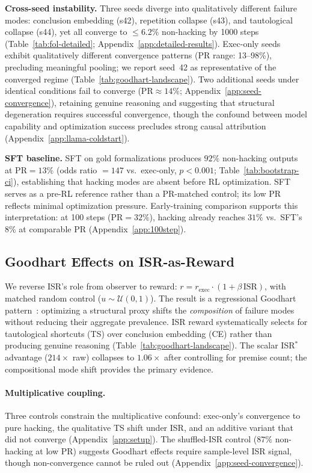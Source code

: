\textbf{Cross-seed instability.}
Three seeds diverge into qualitatively different failure modes: conclusion embedding (s42), repetition collapse (s43), and tautological collapse (s44), yet all converge to ${\leq}6.2\%$ non-hacking by 1000 steps (Table~\ref{tab:fol-detailed}; Appendix~\ref{app:detailed-results}).
Exec-only seeds exhibit qualitatively different convergence patterns (PR range: 13--98\%), precluding meaningful pooling; we report seed~42 as representative of the converged regime (Table~\ref{tab:goodhart-landscape}).
Two additional seeds under identical conditions fail to converge ($\text{PR}{\approx}14\%$; Appendix~\ref{app:seed-convergence}), retaining genuine reasoning and suggesting that structural degeneration requires successful convergence, though the confound between model capability and optimization success precludes strong causal attribution (Appendix~\ref{app:llama-coldstart}).

\textbf{SFT baseline.}
SFT on gold formalizations produces $92\%$ non-hacking outputs at $\text{PR}{=}13\%$ (odds ratio ${=}147$ vs.\ exec-only, $p{<}0.001$; Table~\ref{tab:bootstrap-ci}), establishing that hacking modes are absent before RL optimization.
SFT serves as a pre-RL reference rather than a PR-matched control; its low PR reflects minimal optimization pressure.
Early-training comparison supports this interpretation: at 100 steps ($\text{PR}{=}32\%$), hacking already reaches $31\%$ vs.\ SFT's $8\%$ at comparable PR (Appendix~\ref{app:100step}).

\subsection{Goodhart Effects on ISR-as-Reward}
\label{sec:goodhart}

We reverse ISR's role from observer to reward: $r = r_{\text{exec}}\cdot(1 + \beta\,\text{ISR})$, with matched random control ($u\sim\mathcal{U}(0,1)$).
The result is a regressional Goodhart pattern~\citep{manheim-goodhart-taxonomy}: optimizing a structural proxy shifts the \emph{composition} of failure modes without reducing their aggregate prevalence.
ISR reward systematically selects for tautological shortcuts (TS) over conclusion embedding (CE) rather than producing genuine reasoning (Table~\ref{tab:goodhart-landscape}). The scalar ISR$^*$ advantage ($214\times$ raw) collapses to $1.06\times$ after controlling for premise count; the compositional mode shift provides the primary evidence.

\paragraph{Multiplicative coupling.}
Three controls constrain the multiplicative confound: exec-only's convergence to pure hacking, the qualitative TS shift under ISR, and an additive variant that did not converge (Appendix~\ref{app:setup}).
The shuffled-ISR control ($87\%$ non-hacking at low PR) suggests Goodhart effects require sample-level ISR signal, though non-convergence cannot be ruled out (Appendix~\ref{app:seed-convergence}).

